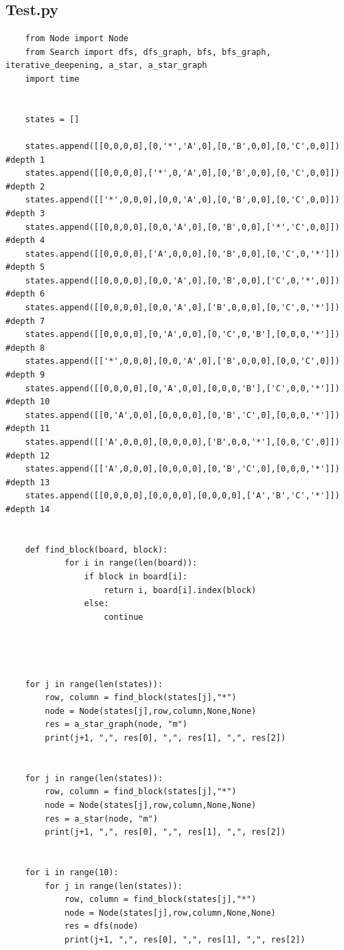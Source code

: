 \documentclass[10pt]{article}
\begin{document}
  \subsection{Test.py}
  \begin{lstlisting}
    from Node import Node
    from Search import dfs, dfs_graph, bfs, bfs_graph, iterative_deepening, a_star, a_star_graph
    import time
    
    
    states = []
    
    states.append([[0,0,0,0],[0,'*','A',0],[0,'B',0,0],[0,'C',0,0]]) #depth 1
    states.append([[0,0,0,0],['*',0,'A',0],[0,'B',0,0],[0,'C',0,0]]) #depth 2
    states.append([['*',0,0,0],[0,0,'A',0],[0,'B',0,0],[0,'C',0,0]]) #depth 3
    states.append([[0,0,0,0],[0,0,'A',0],[0,'B',0,0],['*','C',0,0]]) #depth 4
    states.append([[0,0,0,0],['A',0,0,0],[0,'B',0,0],[0,'C',0,'*']]) #depth 5
    states.append([[0,0,0,0],[0,0,'A',0],[0,'B',0,0],['C',0,'*',0]]) #depth 6
    states.append([[0,0,0,0],[0,0,'A',0],['B',0,0,0],[0,'C',0,'*']]) #depth 7
    states.append([[0,0,0,0],[0,'A',0,0],[0,'C',0,'B'],[0,0,0,'*']]) #depth 8
    states.append([['*',0,0,0],[0,0,'A',0],['B',0,0,0],[0,0,'C',0]]) #depth 9
    states.append([[0,0,0,0],[0,'A',0,0],[0,0,0,'B'],['C',0,0,'*']]) #depth 10
    states.append([[0,'A',0,0],[0,0,0,0],[0,'B','C',0],[0,0,0,'*']]) #depth 11
    states.append([['A',0,0,0],[0,0,0,0],['B',0,0,'*'],[0,0,'C',0]]) #depth 12
    states.append([['A',0,0,0],[0,0,0,0],[0,'B','C',0],[0,0,0,'*']]) #depth 13
    states.append([[0,0,0,0],[0,0,0,0],[0,0,0,0],['A','B','C','*']]) #depth 14
    
    
    def find_block(board, block):
            for i in range(len(board)):
                if block in board[i]:
                    return i, board[i].index(block)
                else:
                    continue
    
    
    
    
    for j in range(len(states)):
        row, column = find_block(states[j],"*")
        node = Node(states[j],row,column,None,None)
        res = a_star_graph(node, "m")
        print(j+1, ",", res[0], ",", res[1], ",", res[2])
    
    
    for j in range(len(states)):
        row, column = find_block(states[j],"*")
        node = Node(states[j],row,column,None,None)
        res = a_star(node, "m")
        print(j+1, ",", res[0], ",", res[1], ",", res[2])
    
    
    for i in range(10):
        for j in range(len(states)):
            row, column = find_block(states[j],"*")
            node = Node(states[j],row,column,None,None)
            res = dfs(node)
            print(j+1, ",", res[0], ",", res[1], ",", res[2])
    

\end{lstlisting}
\end{document}
